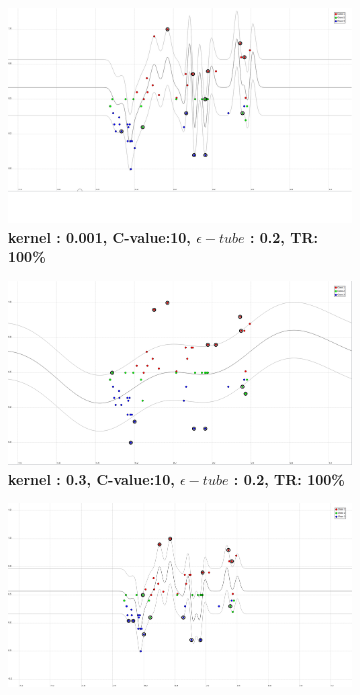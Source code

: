 \begin{figure}[!ht]
\centering
\begin{subfigure}[h]{0.3\textwidth}
\centering
\includegraphics[height=0.08\textheight]{./regression/RBF_0_001_10_0_2_100.png}
\caption{\bf kernel : 0.001, C-value:10, $\epsilon-tube$ : 0.2, TR: 100\%}
\label{fig_RBF_0_001_10_0_2_100}
\end{subfigure}
\begin{subfigure}[h]{0.3\textwidth}
\centering
\includegraphics[height=0.08\textheight]{./regression/RBF_0_3_10_0_2_100.png}
\caption{\bf kernel : 0.3, C-value:10, $\epsilon-tube$ : 0.2, TR: 100\%}
\label{fig_RBF_0_3_10_0_2_100}
\end{subfigure}
\begin{subfigure}[h]{0.3\textwidth}
\centering
\includegraphics[height=0.08\textheight]{./regression/RBF_0_3_1_5_0_2_100.png}

\end{subfigure}
\end{figure}
